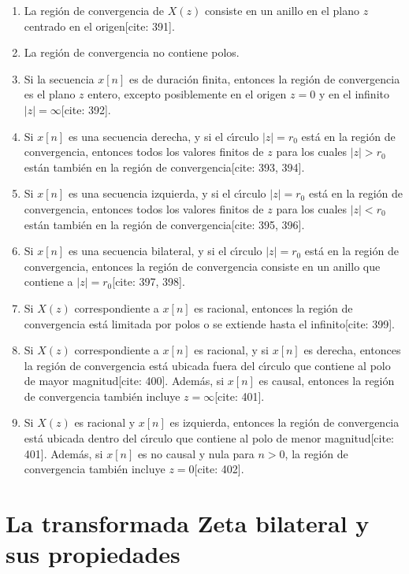 \documentclass[11pt,a4paper,openany]{book}
\begin{document}
\begin{enumerate}
	\item La regi\'{o}n de convergencia de $X(z)$ consiste en un anillo en el plano $z$ centrado en el origen[cite: 391].
	\item La regi\'{o}n de convergencia no contiene polos.
	\item Si la secuencia $x[n]$ es de duraci\'{o}n finita, entonces la regi\'{o}n de convergencia es el plano $z$ entero, excepto posiblemente en el origen $z=0$ y en el infinito $|z|=\infty$[cite: 392].
	\item Si $x[n]$ es una secuencia derecha, y si el c\'{\i}rculo $|z|=r_{0}$ est\'{a} en la regi\'{o}n de convergencia, entonces todos los valores finitos de $z$ para los cuales $|z|>r_{0}$ est\'{a}n tambi\'{e}n en la regi\'{o}n de convergencia[cite: 393, 394].
	\item Si $x[n]$ es una secuencia izquierda, y si el c\'{\i}rculo $|z|=r_{0}$ est\'{a} en la regi\'{o}n de convergencia, entonces todos los valores finitos de $z$ para los cuales $|z|<r_{0}$ est\'{a}n tambi\'{e}n en la regi\'{o}n de convergencia[cite: 395, 396].
	\item Si $x[n]$ es una secuencia bilateral, y si el c\'{\i}rculo $|z|=r_{0}$ est\'{a} en la regi\'{o}n de convergencia, entonces la regi\'{o}n de convergencia consiste en un anillo que contiene a $|z|=r_{0}$[cite: 397, 398].
	\item Si $X(z)$ correspondiente a $x[n]$ es racional, entonces la regi\'{o}n de convergencia est\'{a} limitada por polos o se extiende hasta el infinito[cite: 399].
	\item Si $X(z)$ correspondiente a $x[n]$ es racional, y si $x[n]$ es derecha, entonces la regi\'{o}n de convergencia est\'{a} ubicada fuera del c\'{\i}rculo que contiene al polo de mayor magnitud[cite: 400]. Adem\'{a}s, si $x[n]$ es causal, entonces la regi\'{o}n de convergencia tambi\'{e}n incluye $z=\infty$[cite: 401].
	\item Si $X(z)$ es racional y $x[n]$ es izquierda, entonces la regi\'{o}n de convergencia est\'{a} ubicada dentro del c\'{\i}rculo que contiene al polo de menor magnitud[cite: 401]. Adem\'{a}s, si $x[n]$ es no causal y nula para $n>0$, la regi\'{o}n de convergencia tambi\'{e}n incluye $z=0$[cite: 402].
\end{enumerate}

\section{La transformada Zeta bilateral y sus propiedades}
\end{document}
